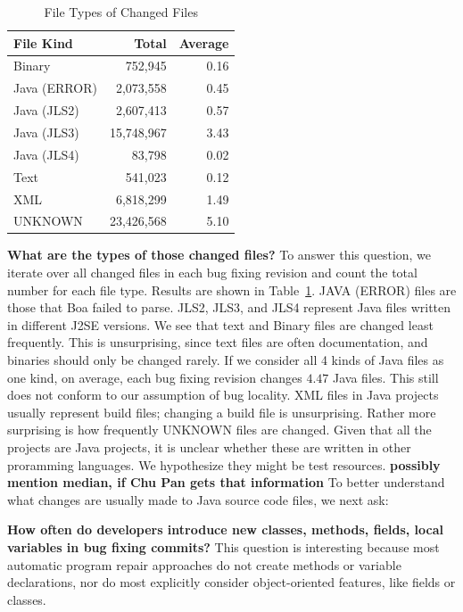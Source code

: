\documentclass{sig-alternate-05-2015}
\newcommand{\todo}[1]
  {{\scriptsize \textbf{\color{red} {#1}}}}
\begin{document}
\begin{table}
\centering
  \begin{tabular}{ l | r  r }
  \toprule
  File Kind & Total & Average \\ 
  \midrule
  Binary & 752,945 & 0.16 \\ 
  Java (ERROR) & 2,073,558 & 0.45 \\ 
  Java (JLS2) & 2,607,413 & 0.57 \\ 
  Java (JLS3) & 15,748,967 & 3.43 \\
  Java (JLS4)  & 83,798 & 0.02 \\ 
  Text & 541,023 & 0.12 \\ 
  XML & 6,818,299 & 1.49 \\ 
  UNKNOWN & 23,426,568 & 5.10 \\ 
\bottomrule
  \end{tabular}
  \caption{File Types of Changed Files}
  \label{tbl:fileType}
\end{table}
\vspace{1ex}
\noindent\textbf{What are the types of those changed files?}
%
To answer this question, we iterate over all changed files in each bug fixing
revision and count the total number for each file type. Results are shown in
Table~\ref{tbl:fileType}.
%
JAVA (ERROR) files are those that Boa failed to parse. JLS2,
JLS3, and JLS4 represent Java files written in different J2SE versions.  We see that text and Binary files are
changed least frequently. This is unsurprising, since text files are often
documentation, and binaries should only be changed rarely. If we consider all 4 kinds of Java
files as one kind, on average, each bug fixing revision changes $4.47$ Java
files. This still does not conform to our assumption of bug locality. XML
files in Java projects usually represent build files; changing a build
file is unsurprising.  Rather more surprising is how frequently UNKNOWN files
are changed. Given that all the projects are Java projects, 
it is unclear whether these are written in other proramming
languages. We hypothesize they might be test resources.
\todo{possibly mention median, if Chu Pan gets that information}
To better understand what changes are usually made to Java source code
files, we next ask:

\vspace{1ex}
\noindent\textbf{How often do developers introduce new classes, methods, fields,
	local variables in
bug fixing commits?} 
%
This question is interesting because most automatic program repair approaches
do not create methods or variable declarations, nor do most explicitly consider
object-oriented features, like fields or classes. 
\end{document}
